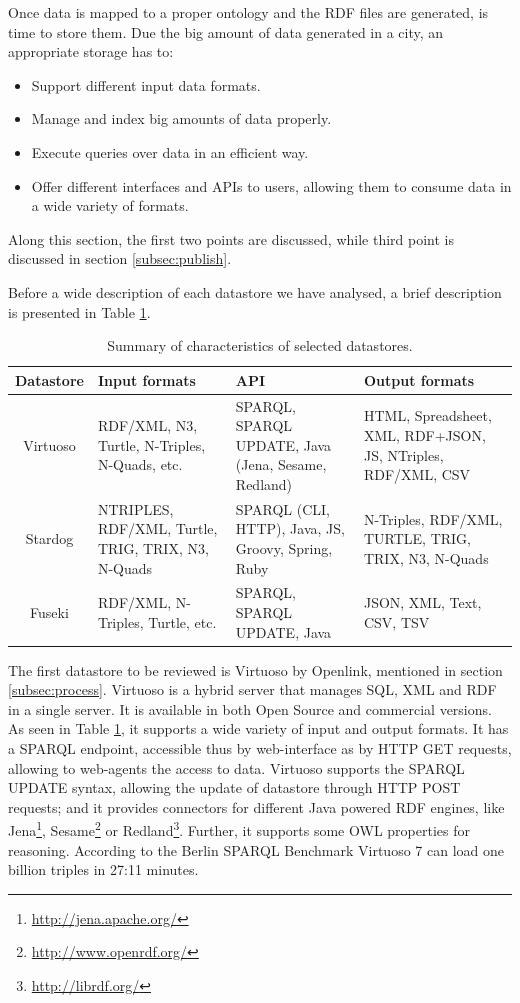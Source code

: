 Once data is mapped to a proper ontology and the RDF files are generated, is time to store them. Due the big amount of data generated in a city, an appropriate storage has to:

\begin{itemize}
    \item Support different input data formats.
    \item Manage and index big amounts of data properly.
    \item Execute queries over data in an efficient way.
    \item Offer different interfaces and APIs to users, allowing them to consume data in a wide variety of formats.
\end{itemize}

Along this section, the first two points are discussed, while third point is discussed in section \ref{subsec:publish}.

Before a wide description of each datastore we have analysed, a brief description is presented in Table \ref{tab:datastores}.

\begin{table}
    \center
    \begin{tabular}{|c|p{2.8cm}|p{2.8cm}|p{2.8cm}|}
        \hline
        \textbf{Datastore} & \textbf{Input formats} & \textbf{API} & \textbf{Output formats} \\
        \hline \hline
        Virtuoso & RDF/XML, N3, Turtle, N-Triples, N-Quads, etc. & SPARQL, SPARQL UPDATE, Java (Jena, Sesame, Redland) & HTML, Spreadsheet, XML, RDF+JSON, JS, NTriples, RDF/XML, CSV \\
        \hline
        Stardog & NTRIPLES, RDF/XML, Turtle, TRIG, TRIX, N3, N-Quads & SPARQL (CLI, HTTP), Java, JS, Groovy, Spring, Ruby & N-Triples, RDF/XML, TURTLE, TRIG, TRIX, N3, N-Quads \\
        \hline
        Fuseki & RDF/XML, N-Triples, Turtle, etc. & SPARQL, SPARQL UPDATE, Java & JSON, XML, Text, CSV, TSV \\
        \hline
    \end{tabular}
    \caption{Summary of characteristics of selected datastores.}
    \label{tab:datastores}
\end{table}

The first datastore to be reviewed is Virtuoso by Openlink, mentioned in section \ref{subsec:process}. Virtuoso is a hybrid server that manages SQL, XML and RDF in a single server. It is available in both Open Source and commercial versions. As seen in Table \ref{tab:datastores}, it supports a wide variety of input and output formats. It has a SPARQL endpoint, accessible thus by web-interface as by HTTP GET requests, allowing to web-agents the access to data. Virtuoso supports the SPARQL UPDATE syntax, allowing the update of datastore through HTTP POST requests; and it provides connectors for different Java powered RDF engines, like Jena\footnote{\url{http://jena.apache.org/}}, Sesame\footnote{\url{http://www.openrdf.org/}} or Redland\footnote{\url{http://librdf.org/}}. Further, it supports some OWL properties for reasoning. According to the Berlin SPARQL Benchmark \cite{bizer2009berlin} Virtuoso 7 can load one billion triples in 27:11 minutes.

